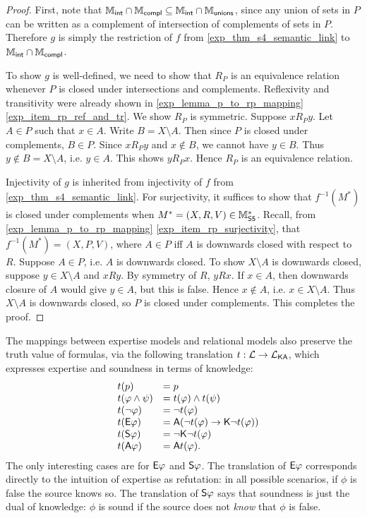 \begin{proof}
    First, note that $\Mint \cap \Mcompl \subseteq \Mint \cap
    \Munions$, since any union of sets in $P$ can be written as a
    complement of intersection of complements of sets in $P$. Therefore
    $g$ is simply the restriction of $f$ from
    \cref{exp_thm_s4_semantic_link} to $\Mint \cap \Mcompl$.

    To show $g$ is well-defined, we need to show that $R_P$ is an equivalence
    relation whenever $P$ is closed under intersections and complements.
    Reflexivity and transitivity were already shown in
    \cref{exp_lemma_p_to_rp_mapping} \cref{exp_item_rp_ref_and_tr}. We show $R_P$ is
    symmetric.  Suppose $x{R_P}y$. Let $A \in P$ such that $x \in A$.  Write $B
    = X \setminus A$. Then since $P$ is closed under complements, $B \in P$.
    Since $x{R_P}y$ and $x \notin B$, we cannot have $y \in B$. Thus $y \notin
    B = X \setminus A$, i.e. $y \in A$. This shows $y{R_P}x$. Hence $R_P$ is an
    equivalence relation.

    Injectivity of $g$ is inherited from injectivity of $f$ from
    \cref{exp_thm_s4_semantic_link}. For surjectivity, it suffices to show that
    $f^{-1}(M^*)$ is closed under complements when $M^* = (X, R, V) \in
    \Msfive$. Recall, from \cref{exp_lemma_p_to_rp_mapping}
    \cref{exp_item_rp_surjectivity}, that $f^{-1}(M^*) = (X, P, V)$, where $A
    \in P$ iff $A$ is downwards closed with respect to $R$. Suppose $A \in P$,
    i.e. $A$ is downwards closed. To show $X \setminus A$ is downwards closed,
    suppose $y \in X \setminus A$ and $xRy$.  By symmetry of $R$, $yRx$. If $x
    \in A$, then downwards closure of $A$ would give $y \in A$, but this is
    false. Hence $x \notin A$, i.e. $x \in X \setminus A$. Thus $X \setminus A$
    is downwards closed, so $P$ is closed under complements. This completes the
    proof.
\end{proof}

The mappings between expertise models and relational models also preserve the
truth value of formulas, via the following translation $t: \cL \to
\cLKA$, which expresses expertise and soundness in terms of knowledge:
\[
\begin{array}{lll}
 &t(p) &= p \\
 &t(\phi \land \psi) &= t(\phi) \land t(\psi) \\
 &t(\neg\phi) &= \neg t(\phi) \\
 &t(\E\phi) &= \A(\neg t(\phi) \limplies \K\neg t(\phi)) \\
 &t(\S\phi) &= \neg\K\neg t(\phi) \\
 &t(\A\phi) &= \A t(\phi).
\end{array}
\]
The only interesting cases are for $\E\phi$ and $\S\phi$. The
translation of $\E\phi$ corresponds directly to the intuition of
expertise as refutation: in all possible scenarios, if $\phi$ is false
the source knows so. The translation of $\S\phi$ says that soundness is
just the dual of knowledge: $\phi$ is sound if the source does not \emph{know}
that $\phi$ is false.

